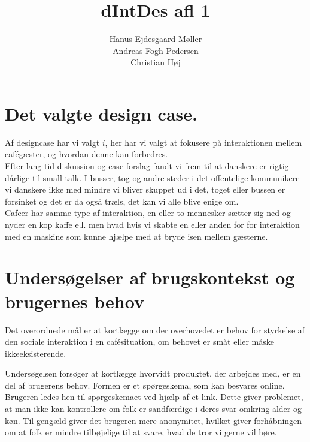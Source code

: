 \documentclass{article}
\title{dIntDes afl 1}
\author{
	Hanus Ejdesgaard Møller \\
	Andreas Fogh-Pedersen \\
	Christian Høj
}
\begin{document}
\maketitle
\section{Det valgte design case.}
    Af designcase har vi valgt $ i $, her har vi valgt at fokusere på interaktionen mellem cafégæster, og hvordan denne kan forbedres.\\
    Efter lang tid diskussion og case-forslag fandt vi frem til at danskere er rigtig dårlige til small-talk. I busser, tog og andre steder i det offentelige kommunikere vi danskere ikke med mindre vi bliver skuppet ud i det, toget eller bussen er forsinket og det er da også træls, det kan vi alle blive enige om.\\
    Cafeer har samme type af interaktion, en eller to mennesker sætter sig ned og nyder en kop kaffe e.l. men hvad hvis vi skabte en eller anden for for interaktion med en maskine som kunne hjælpe med at bryde isen mellem gæsterne.
    
\section{Undersøgelser af brugskontekst og brugernes behov}

    Det overordnede mål er at kortlægge om der overhovedet er behov for styrkelse af den sociale interaktion i en cafésituation, om behovet er småt eller måske ikkeeksisterende.

    Undersøgelsen forsøger at kortlægge hvorvidt produktet, der arbejdes med, er en del af brugerens behov. Formen er et spørgeskema, som kan besvares online. Brugeren ledes hen til spørgeskemaet ved hjælp af et link. Dette giver problemet, at man ikke kan kontrollere om folk er sandfærdige i deres svar omkring alder og køn. Til gengæld giver det brugeren mere anonymitet, hvilket giver forhåbningen om at folk er mindre tilbøjelige til at svare, hvad de tror vi gerne vil høre.
\end{document}
